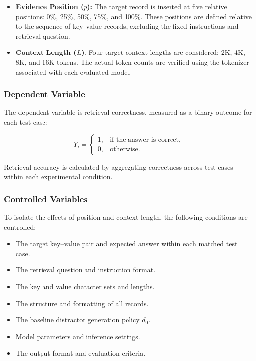 \begin{itemize}
    \item \textbf{Evidence Position ($p$):}
    The target record is inserted at five relative positions:
    0\%, 25\%, 50\%, 75\%, and 100\%.
    These positions are defined relative to the sequence
    of key--value records, excluding the fixed instructions
    and retrieval question.

    \item \textbf{Context Length ($L$):}
    Four target context lengths are considered:
    2K, 4K, 8K, and 16K tokens.
    The actual token counts are verified using the tokenizer
    associated with each evaluated model.
\end{itemize}

\subsubsection{Dependent Variable}

The dependent variable is retrieval correctness, measured
as a binary outcome for each test case:

\begin{equation}
    Y_i =
    \begin{cases}
        1, & \text{if the answer is correct},\\
        0, & \text{otherwise}.
    \end{cases}
    \label{eq:correctness}
\end{equation}

Retrieval accuracy is calculated by aggregating correctness
across test cases within each experimental condition.

\subsubsection{Controlled Variables}

To isolate the effects of position and context length,
the following conditions are controlled:

\begin{itemize}
    \item The target key--value pair and expected answer
    within each matched test case.
    \item The retrieval question and instruction format.
    \item The key and value character sets and lengths.
    \item The structure and formatting of all records.
    \item The baseline distractor generation policy $d_0$.
    \item Model parameters and inference settings.
    \item The output format and evaluation criteria.
\end{itemize}

